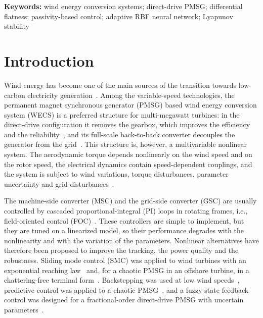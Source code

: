 \documentclass[11pt,a4paper]{article}
\begin{document}
\vspace{4pt}
\noindent\textbf{Keywords:} wind energy conversion systems; direct-drive PMSG; differential flatness;
passivity-based control; adaptive RBF neural network; Lyapunov stability

\section{Introduction}
Wind energy has become one of the main sources of the transition towards low-carbon electricity
generation~\cite{barthelmie2021,iea2024,gwec2024}. Among the variable-speed technologies, the
permanent magnet synchronous generator (PMSG) based wind energy conversion system (WECS) is a preferred
structure for multi-megawatt turbines: in the direct-drive configuration it removes the gearbox, which
improves the efficiency and the reliability~\cite{polinder2013,yaramasu2015}, and its full-scale
back-to-back converter decouples the generator from the grid~\cite{wu2011}. This structure is, however, a
multivariable nonlinear system. The aerodynamic torque depends nonlinearly on the wind speed and on the
rotor speed, the electrical dynamics contain speed-dependent couplings, and the system is subject to
wind variations, torque disturbances, parameter uncertainty and grid disturbances~\cite{rolan2009,aimene2022}.

The machine-side converter (MSC) and the grid-side converter (GSC) are usually controlled by cascaded
proportional-integral (PI) loops in rotating frames, i.e., field-oriented control
(FOC)~\cite{chinchilla2006,yazdani2010,blaabjerg2006}. These controllers are simple to implement, but
they are tuned on a linearized model, so their performance degrades with the nonlinearity and with the
variation of the parameters. Nonlinear alternatives have therefore been proposed to improve the tracking,
the power quality and the robustness. Sliding mode control (SMC) was applied to wind turbines with an
exponential reaching law~\cite{mechter2015} and, for a chaotic PMSG in an offshore turbine, in a
chattering-free terminal form~\cite{benabdeeseelam2025}. Backstepping was used at low wind
speeds~\cite{mechter2016}, predictive control was applied to a chaotic PMSG~\cite{messadi2015}, and a
fuzzy state-feedback control was designed for a fractional-order direct-drive PMSG with uncertain
parameters~\cite{yang2021}.
\end{document}

